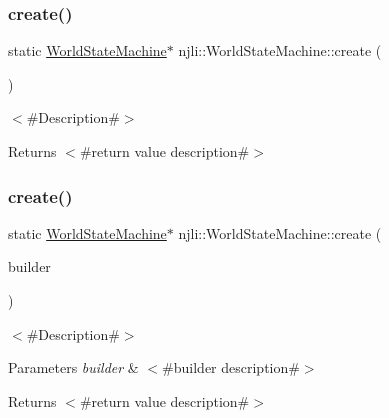 \subsubsection{\texorpdfstring{create()}{create()}\hspace{0.1cm}{\footnotesize\ttfamily [1/2]}}
{\footnotesize\ttfamily static \mbox{\hyperlink{classnjli_1_1_world_state_machine}{World\+State\+Machine}}$\ast$ njli\+::\+World\+State\+Machine\+::create (\begin{DoxyParamCaption}{ }\end{DoxyParamCaption})\hspace{0.3cm}{\ttfamily [static]}}

$<$\#\+Description\#$>$

\begin{DoxyReturn}{Returns}
$<$\#return value description\#$>$ 
\end{DoxyReturn}
\mbox{\label{classnjli_1_1_world_state_machine_aa57a3c28f3c169d27affa3a515539734}} 
\subsubsection{\texorpdfstring{create()}{create()}\hspace{0.1cm}{\footnotesize\ttfamily [2/2]}}
{\footnotesize\ttfamily static \mbox{\hyperlink{classnjli_1_1_world_state_machine}{World\+State\+Machine}}$\ast$ njli\+::\+World\+State\+Machine\+::create (\begin{DoxyParamCaption}\item[{const \mbox{\hyperlink{classnjli_1_1_world_state_machine_builder}{World\+State\+Machine\+Builder}} \&}]{builder }\end{DoxyParamCaption})\hspace{0.3cm}{\ttfamily [static]}}

$<$\#\+Description\#$>$


\begin{DoxyParams}{Parameters}
{\em builder} & $<$\#builder description\#$>$\\
\hline
\end{DoxyParams}
\begin{DoxyReturn}{Returns}
$<$\#return value description\#$>$ 
\end{DoxyReturn}
\mbox{\label{classnjli_1_1_world_state_machine_a9cd827ef35493760200956179fd35bcd}} 

